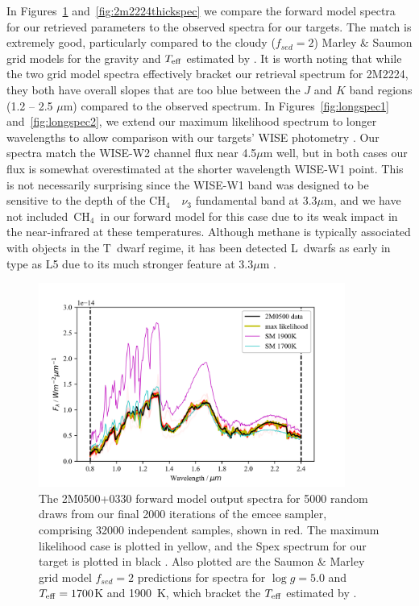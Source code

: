 \documentclass[useAMS,usenatbib]{mn2e}
\newcommand{\meth}{\mbox{CH$_{4}$ }}
\begin{document}
In Figures~\ref{fig:2m0500thickspec} and~\ref{fig:2m2224thickspec} we compare the forward model spectra for our retrieved parameters to the observed spectra for our targets. The match is extremely good, particularly compared to the cloudy ($f_{sed} = 2$) Marley \& Saumon grid models for the gravity and $T_{\rm eff}$ estimated by \citet{filippazzo2015}. It is worth noting that while the two grid model spectra effectively bracket our retrieval spectrum for 2M2224, they both have overall slopes that are too blue between the $J$ and $K$ band regions (1.2 -- 2.5 $\mu$m) compared to the observed spectrum. In Figures~\ref{fig:longspec1} and~\ref{fig:longspec2},  we extend our maximum likelihood spectrum to longer wavelengths to allow comparison with our targets' WISE photometry \citet{wise}. Our spectra match the WISE-W2  channel flux near 4.5$\mu$m well, but in both cases our flux is somewhat overestimated at the shorter wavelength WISE-W1 point. This is not necessarily surprising since the WISE-W1 band was designed to be sensitive to the depth of the \meth~$\nu_{3}$ fundamental band at 3.3$\mu$m, and we have not included~\meth in our forward model for this case due to its weak impact in the near-infrared at these temperatures. Although methane is typically associated with objects in the T~dwarf regime, it has been detected L~dwarfs as early in type as L5 due to its much stronger feature at 3.3$\mu$m \citep[e.g. ][]{noll2000,stephens2009}.

\begin{figure}
\hspace{-0.8cm}\includegraphics[width=285pt]{2M0500_spag_spec_ThickPow_ucl.png}
\caption{ The 2M0500+0330 forward model output spectra for 5000 random draws from our final 2000 iterations of the {\sc emcee} sampler, comprising 32000 independent samples, shown in red. The maximum likelihood case is plotted in yellow, and the Spex spectrum for our target is plotted in black \citep{gagliuffi2014}. Also plotted are the Saumon \& Marley grid model $f_{sed} = 2$ predictions for spectra for $\log g = 5.0$ and $T_{\rm eff} = 1700$K and 1900~K, which bracket the $T_{\rm eff}$ estimated by \citet{filippazzo2015}.
\label{fig:2m0500thickspec}}
\end{figure}
\end{document}
